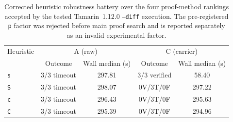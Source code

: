 \begin{table}[tb]
\centering
\caption{Corrected heuristic robustness battery over the four proof-method rankings accepted by the tested Tamarin~1.12.0 \texttt{--diff} execution. The pre-registered \texttt{p} factor was rejected before main proof search and is reported separately as an invalid experimental factor.}
\label{tab:robustness-battery-r1-v3}
\scriptsize
\setlength{\tabcolsep}{4pt}
\begin{tabular}{@{}lcccc@{}}
\hline
Heuristic & \multicolumn{2}{c}{A (raw)} & \multicolumn{2}{c}{C (carrier)} \\
 & Outcome & Wall median (s) & Outcome & Wall median (s) \\
\hline
\texttt{s} & 3/3 timeout & 297.81 & 3/3 verified & 58.40 \\
\texttt{S} & 3/3 timeout & 298.07 & 0V/3T/0F & 297.22 \\
\texttt{c} & 3/3 timeout & 296.43 & 0V/3T/0F & 295.63 \\
\texttt{C} & 3/3 timeout & 295.39 & 0V/3T/0F & 294.96 \\
\hline
\end{tabular}
\end{table}
